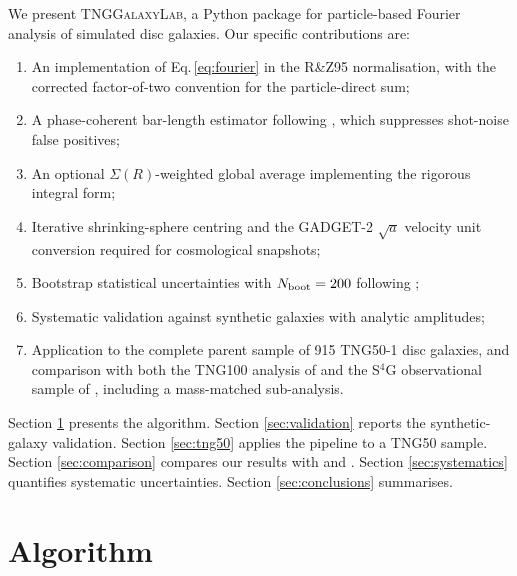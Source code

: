 \documentclass[fleqn,usenatbib]{mnras}
\newcommand{\Nboot}{N_{\rm boot}}
\newcommand{\pipeline}{\textsc{TNGGalaxyLab}}
\begin{document}
We present \pipeline, a Python package for particle-based Fourier
analysis of simulated disc galaxies.  Our specific contributions
are:
\begin{enumerate}
  \item An implementation of Eq.\,\ref{eq:fourier} in the R\&Z95
        normalisation, with the corrected factor-of-two convention
        for the particle-direct sum;
  \item A phase-coherent bar-length estimator following
        \citet{2005A&A...434..109A}, which suppresses shot-noise false
        positives;
  \item An optional $\Sigma(R)$-weighted global average
        implementing the rigorous \citet{2002A&A...391..471J} integral form;
  \item Iterative shrinking-sphere centring \citep{2003MNRAS.338...14P}
        and the GADGET-2 $\sqrt{a}$ velocity unit conversion
        \citep{2005MNRAS.364.1105S,2019ComAC...6....2N} required for
        cosmological snapshots;
  \item Bootstrap statistical uncertainties with $\Nboot = 200$
        following \citet{Efron1995AnIT};
  \item Systematic validation against synthetic galaxies with
        analytic amplitudes;
  \item Application to the complete parent sample of 915 TNG50-1 disc galaxies, and comparison with
        both the TNG100 analysis of \citet{2022A&A...662A..53L} and the
        S$^{4}$G observational sample of \citet{2013ApJ...772..135Z},
        including a mass-matched sub-analysis.
\end{enumerate}

Section \ref{sec:algorithm} presents the algorithm.
Section \ref{sec:validation} reports the synthetic-galaxy validation.
Section \ref{sec:tng50} applies the pipeline to a TNG50 sample.
Section \ref{sec:comparison} compares our results with
\citet{2022A&A...662A..53L} and \citet{2013ApJ...772..135Z}.
Section \ref{sec:systematics} quantifies systematic uncertainties.
Section \ref{sec:conclusions} summarises.


\section{Algorithm}
\label{sec:algorithm}
\end{document}
